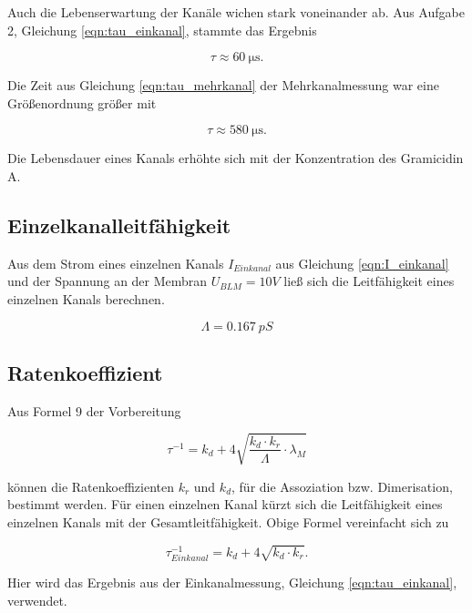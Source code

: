 \documentclass[a4paper,ngerman]{scrartcl}
\begin{document}
Auch die Lebenserwartung der Kanäle wichen stark voneinander ab. Aus Aufgabe 2, Gleichung \ref{eqn:tau_einkanal}, stammte das Ergebnis

\begin{equation}
\tau \approx \SI{60}{\micro\s}.
\end{equation}

Die Zeit aus Gleichung \ref{eqn:tau_mehrkanal} der Mehrkanalmessung war eine Größenordnung größer mit

\begin{equation}
\tau \approx \SI{580}{\micro\s}.
\end{equation}

Die Lebensdauer eines Kanals erhöhte sich mit der Konzentration des Gramicidin A.

\subsection{Einzelkanalleitfähigkeit}

Aus dem Strom eines einzelnen Kanals $I_{Einkanal}$ aus Gleichung \ref{eqn:I_einkanal} und der Spannung an der Membran $U_{BLM}= 10 V$ ließ sich die Leitfähigkeit eines einzelnen Kanals berechnen.

\begin{equation}
\label{eqn:Einkanal-leit}
\Lambda = \SI{0.167}{pS}
\end{equation}

\subsection{Ratenkoeffizient}

Aus Formel 9 der Vorbereitung

\begin{equation}
\label{eqn:raten}
\tau^{-1} = k_d + 4 \sqrt{\frac{k_d \cdot k_r}{\Lambda}  \cdot \lambda_M} 
\end{equation}

können die Ratenkoeffizienten $k_{r}$ und $k_{d}$, für die Assoziation bzw. Dimerisation, bestimmt werden. Für einen einzelnen Kanal kürzt sich die Leitfähigkeit eines einzelnen Kanals mit der Gesamtleitfähigkeit. Obige Formel vereinfacht sich zu

\begin{equation}
\label{eqn:raten_einkanal_kurz}
\tau_{Einkanal}^{-1} = k_d + 4 \sqrt{k_d \cdot k_r }.
\end{equation}

Hier wird das Ergebnis aus der Einkanalmessung, Gleichung \ref{eqn:tau_einkanal}, verwendet.
\end{document}
